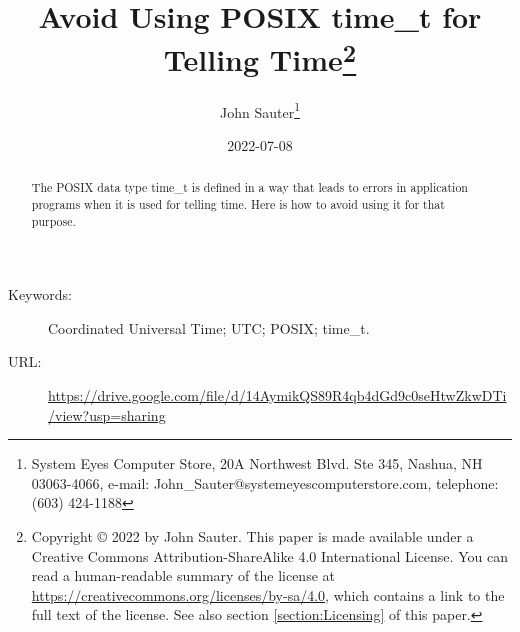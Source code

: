 \documentclass[letterpaper,twoside]{article}
\begin{document}
\title{Avoid Using POSIX {\ttfamily time\_t} for Telling
  Time\footnote{Copyright
    {\copyright} 2022 by John Sauter.
    This paper is made available under a
    Creative Commons Attribution-ShareAlike 4.0 International License.
    You can read a human-readable summary of the license at
    \href{https://creativecommons.org/licenses/by-sa/4.0}{https://creativecommons.org/licenses/by-sa/4.0},
    which contains a link to the full text of the license.
    See also section \ref{section:Licensing} of this paper.}
}
\author{John Sauter\footnote{
    System Eyes Computer Store,
    20A Northwest Blvd.  Ste 345,
    Nashua, NH  03063-4066,
    e-mail: John\_Sauter@systemeyescomputerstore.com,
    telephone: (603) 424-1188}}
\date{2022-07-08}
\maketitle
\begin{abstract}
  The POSIX data type {\ttfamily time\_t} is defined in a way that leads
  to errors in application programs when it is used for telling time.
  Here is how to avoid using it for that purpose.
\end{abstract}
\begin{description}
\item[Keywords:]Coordinated Universal Time; UTC; POSIX; time\_t.
\item[URL:]\href{https://drive.google.com/file/d/14AymikQS89R4qb4dGd9c0seHtwZkwDTi/view?usp=sharing}{https://drive.google.com/file/d/14AymikQS89R4qb4dGd9c0seHtwZkwDTi/view?usp=sharing}
\end{description}
  
\end{document}
